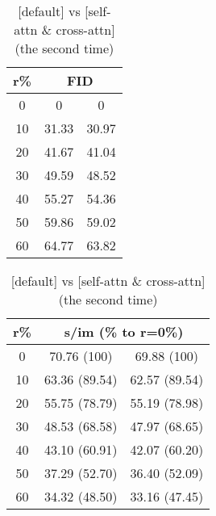 \begin{table}[htp]
\caption{[default] vs [self-attn \& cross-attn] (the second time)}
\label{table:exp_1_4}
    \begin{minipage}{0.48\textwidth}
        \centering
        \begin{tabular}{|c||c|c|}
            \hline
            \multicolumn{1}{|c||}{r\%} & \multicolumn{2}{c|}{FID}\\
            \hline
            0 & 0 & 0 \\
            10 & 31.33 & 30.97 \\
            20 & 41.67 & 41.04 \\
            30 & 49.59 & 48.52 \\
            40 & 55.27 & 54.36 \\
            50 & 59.86 & 59.02 \\
            60 & 64.77 & 63.82 \\
            \hline
        \end{tabular}
    \end{minipage}
    \hfill
    \begin{minipage}{0.48\textwidth}
        \centering
        \begin{tabular}{|c||c|c|}
            \hline
            \multicolumn{1}{|c||}{r\%} & \multicolumn{2}{c|}{s/im (\% to r=0\%)}\\
            \hline
            0 & 70.76 (100) & 69.88 (100) \\
            10 & 63.36 (89.54) & 62.57 (89.54) \\
            20 & 55.75 (78.79) & 55.19 (78.98) \\
            30 & 48.53 (68.58) & 47.97 (68.65) \\
            40 & 43.10 (60.91) & 42.07 (60.20) \\
            50 & 37.29 (52.70) & 36.40 (52.09) \\
            60 & 34.32 (48.50) & 33.16 (47.45) \\
            \hline
        \end{tabular}
    \end{minipage}
\end{table}
